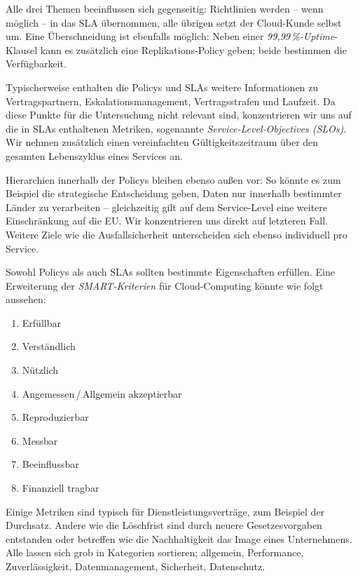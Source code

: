 \noindent Alle drei Themen beeinflussen sich gegenseitig: Richtlinien werden -- wenn möglich -- in das SLA übernommen, alle übrigen setzt der Cloud-Kunde selbst um. Eine Überschneidung ist ebenfalls möglich: Neben einer \emph{99,99\,\%-Uptime}-Klausel kann es zusätzlich eine Replikations-Policy geben; beide bestimmen die Verfügbarkeit.

Typischerweise enthalten die Policys und SLAs weitere Informationen zu Vertragspartnern, Eskalationsmanagement, Vertragsstrafen und Laufzeit. Da diese Punkte für die Untersuchung nicht relevant sind, konzentrieren wir uns auf die in SLAs enthaltenen Metriken, sogenannte \emph{Service-Level-Objectives (SLOs)}. Wir nehmen zusätzlich einen vereinfachten Gültigkeitszeitraum über den gesamten Lebenszyklus eines Services an.

Hierarchien innerhalb der Policys bleiben ebenso außen vor: So könnte es zum Beispiel die strategische Entscheidung geben, Daten nur innerhalb bestimmter Länder zu verarbeiten -- gleichzeitig gilt auf dem Service-Level eine weitere Einschränkung auf die EU. Wir konzentrieren uns direkt auf letzteren Fall. Weitere Ziele wie die Ausfallsicherheit unterscheiden sich ebenso individuell pro Service.

Sowohl Policys als auch SLAs sollten bestimmte Eigenschaften erfüllen. Eine Erweiterung der \emph{SMART-Kriterien} \cite{doran:1981:smart-goals} für Cloud-Computing könnte wie folgt aussehen:

\begin{enumerate}
	\item Erfüllbar
	\item Verständlich
	\item Nützlich
	\item Angemessen\,/\,Allgemein akzeptierbar
	\item Reproduzierbar
	\item Messbar
	\item Beeinflussbar
	\item Finanziell tragbar
\end{enumerate}

\noindent 
Einige Metriken sind typisch für Dienstleistungsverträge, zum Beispiel der Durchsatz. Andere wie die Löschfrist sind durch neuere Gesetzesvorgaben entstanden oder betreffen wie die Nachhaltigkeit das Image eines Unternehmens. Alle lassen sich grob in Kategorien sortieren; allgemein, Performance, Zuverlässigkeit, Datenmanagement, Sicherheit, Datenschutz.

